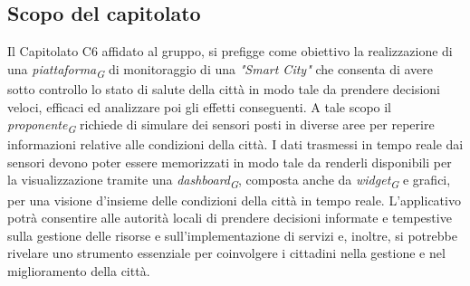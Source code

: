 \subsection{Scopo del capitolato}
    Il Capitolato C6 affidato al gruppo, si prefigge come obiettivo la realizzazione di una \textit{piattaforma}\textsubscript{\textit{G}} di monitoraggio di una \textit{"Smart City"} che consenta di avere sotto controllo lo stato di salute della città in modo tale da prendere decisioni veloci, efficaci ed analizzare poi gli effetti conseguenti.
    A tale scopo il \textit{proponente}\textsubscript{\textit{G}} richiede di simulare dei sensori posti in diverse aree per reperire informazioni relative alle condizioni della città.  
    I dati trasmessi in tempo reale dai sensori devono poter essere memorizzati in modo tale da renderli disponibili per la visualizzazione tramite una \textit{dashboard}\textsubscript{\textit{G}}, composta anche da \textit{widget}\textsubscript{\textit{G}} e grafici, per una visione d'insieme delle condizioni della città in tempo reale.  
    L'applicativo potrà consentire alle autorità locali di prendere decisioni informate e tempestive sulla gestione delle risorse e sull'implementazione di servizi e, inoltre, si potrebbe rivelare uno strumento essenziale per coinvolgere i cittadini nella gestione e nel miglioramento della città.  
